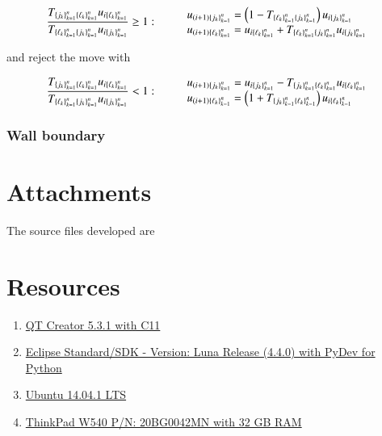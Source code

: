 \documentclass[11pt,english,a4paper]{article}
\begin{document}
\begin{flushleft}
\begin{align}
\frac{T_{\kr{j_k}_{k=1}^n\kr{\ell_k}_{k=1}^n}u_{i\kr{\ell_k}_{k=1}^n}} {T_{\kr{\ell_k}_{k=1}^n\kr{j_k}_{k=1}^n}u_{i\kr{j_k}_{k=1}^n}} \geq 1 :
\qquad
 \begin{tabular}{l} $u_{(i+1)\kr{j_k}_{k=1}^n} = \p{1-T_{\kr{\ell_k}_{k=1}^n\kr{j_k}_{k=1}^n}} u_{i\kr{j_k}_{k=1}^n}$ \\ $u_{(i+1)\kr{\ell_k}_{k=1}^n} = u_{i\kr{\ell_k}_{k=1}^n} + T_{\kr{\ell_k}_{k=1}^n\kr{j_k}_{k=1}^n} u_{i\kr{j_k}_{k=1}^n}$ \end{tabular}
 \label{eq_47}
\end{align}

and reject the move with

\begin{align}
\frac{T_{\kr{j_k}_{k=1}^n\kr{\ell_k}_{k=1}^n}u_{i\kr{\ell_k}_{k=1}^n}} {T_{\kr{\ell_k}_{k=1}^n\kr{j_k}_{k=1}^n}u_{i\kr{j_k}_{k=1}^n}} < 1 :
\qquad
 \begin{tabular}{l} $u_{(i+1)\kr{j_k}_{k=1}^n} = u_{i\kr{j_k}_{k=1}^n} - T_{\kr{j_k}_{k=1}^n\kr{\ell_k}_{k=1}^n} u_{i\kr{\ell_k}_{k=1}^n}$ \\ $u_{(i+1)\kr{\ell_k}_{k=1}^n} = \p{1+T_{\kr{j_k}_{k=1}^n\kr{\ell_k}_{k=1}^n}} u_{i\kr{\ell_k}_{k=1}^n}$ \end{tabular}
 \label{eq_48}
\end{align}

\subsubsection{Wall boundary}

\section{Attachments}

The source files developed are


\section{Resources}

\begin{enumerate}
\item{\href{http://qt-project.org/downloads}{QT Creator 5.3.1 with C11}}
\item{\href{https://www.eclipse.org/downloads/}{Eclipse Standard/SDK  - Version: Luna Release (4.4.0) with PyDev for Python}}
\item{\href{http://www.ubuntu.com/download/desktop}{Ubuntu 14.04.1 LTS}}
\item{\href{http://shop.lenovo.com/no/en/laptops/thinkpad/w-series/w540/#tab-reseller}{ThinkPad W540 P/N: 20BG0042MN with 32 GB RAM}}
\end{enumerate}


\end{flushleft}
\end{document}
